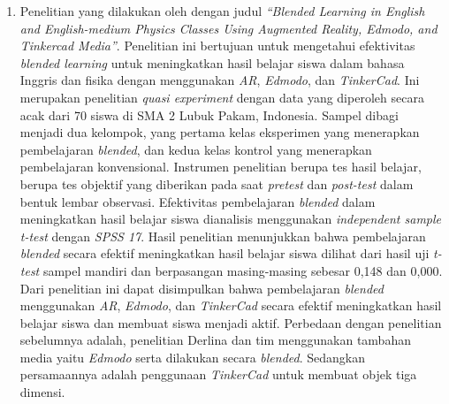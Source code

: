 \documentclass[12pt]{article}
\begin{document}
\begin{enumerate}
    \item Penelitian yang dilakukan oleh \citet{derlina2020blended} dengan judul \textit{“Blended Learning in English and English-medium Physics Classes Using Augmented Reality, Edmodo, and Tinkercad Media”}. Penelitian ini bertujuan untuk mengetahui efektivitas \textit{blended learning} untuk meningkatkan hasil belajar siswa dalam bahasa Inggris dan fisika dengan menggunakan \textit{AR}, \textit{Edmodo}, dan \textit{TinkerCad}. Ini merupakan penelitian \textit{quasi experiment} dengan data yang diperoleh secara acak dari 70 siswa di SMA 2 Lubuk Pakam, Indonesia. Sampel dibagi menjadi dua kelompok, yang pertama kelas eksperimen yang menerapkan pembelajaran \textit{blended}, dan kedua kelas kontrol yang menerapkan pembelajaran konvensional. Instrumen penelitian berupa tes hasil belajar, berupa tes objektif yang diberikan pada saat \textit{pretest} dan \textit{post-test} dalam bentuk lembar observasi. Efektivitas pembelajaran \textit{blended} dalam meningkatkan hasil belajar siswa dianalisis menggunakan \textit{independent sample t-test} dengan \textit{SPSS 17}. Hasil penelitian menunjukkan bahwa pembelajaran \textit{blended} secara efektif meningkatkan hasil belajar siswa dilihat dari hasil uji \textit{t-test} sampel mandiri dan berpasangan masing-masing sebesar 0{,}148 dan 0{,}000. Dari penelitian ini dapat disimpulkan bahwa pembelajaran \textit{blended} menggunakan \textit{AR}, \textit{Edmodo}, dan \textit{TinkerCad} secara efektif meningkatkan hasil belajar siswa dan membuat siswa menjadi aktif. Perbedaan dengan penelitian sebelumnya adalah, penelitian Derlina dan tim menggunakan tambahan media yaitu \textit{Edmodo} serta dilakukan secara \textit{blended}. Sedangkan persamaannya adalah penggunaan \textit{TinkerCad} untuk membuat objek tiga dimensi.
\end{enumerate}
\end{document}
